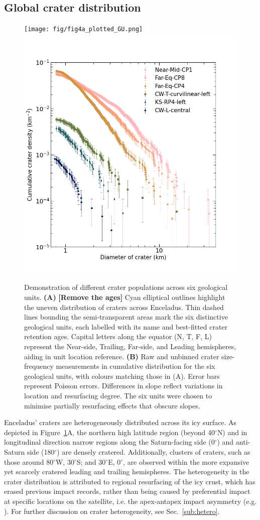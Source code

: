 \documentclass[preprint,11pt,3p,times,authoryear]{elsarticle}
\begin{document}
{\subsection{Global crater distribution}
\label{subsec:crater_dist}

\begin{figure}[ht!]
    \centering
    \texttt{[image: fig/fig4a\_plotted\_GU.png]}
    \includegraphics[width=0.5\linewidth]{fig/compare_fig4_icarus.png}
    \caption{Demonstration of different crater populations across six geological units.
        \textbf{(A)} \textbf{[Remove the ages]} Cyan elliptical outlines highlight the uneven distribution of craters across Enceladus. Thin dashed lines bounding the semi-transparent areas mark the six distinctive geological units, each labelled with its name and best-fitted crater retention ages. Capital letters along the equator (N, T, F, L) represent the Near-side, Trailing, Far-side, and Leading hemispheres, aiding in unit location reference.
        \textbf{(B)} Raw and unbinned crater size-frequency measurements in cumulative distribution for the six geological units, with colours matching those in (A). Error bars represent Poisson errors. Differences in slope reflect variations in location and resurfacing degree. The six units were chosen to minimise partially resurfacing effects that obscure slopes. }
    \label{fig:crater}
\end{figure}

Enceladus' craters are heterogeneously distributed across its icy surface. As depicted in Figure~\ref{fig:crater}A, the northern high latitude region (beyond 40$^\circ$N) and in longitudinal direction narrow regions along the Saturn-facing side (0$^\circ$) and anti-Saturn side (180$^\circ$) are densely cratered. Additionally, clusters of craters, such as those around 80$^\circ$W, 30$^\circ$S; and 30$^\circ$E, 0$^\circ$, are observed within the more expansive yet scarcely cratered leading and trailing hemispheres. The heterogeneity in the crater distribution is attributed to regional resurfacing of the icy crust, which has erased previous impact records, rather than being caused by preferential impact at specific locations on the satellite, i.e. the apex-antapex impact asymmetry (e.g. \citealt{Cuk2016}). For further discussion on crater heterogeneity, see Sec.~\ref{sub:hetero}.\\

}
\end{document}
